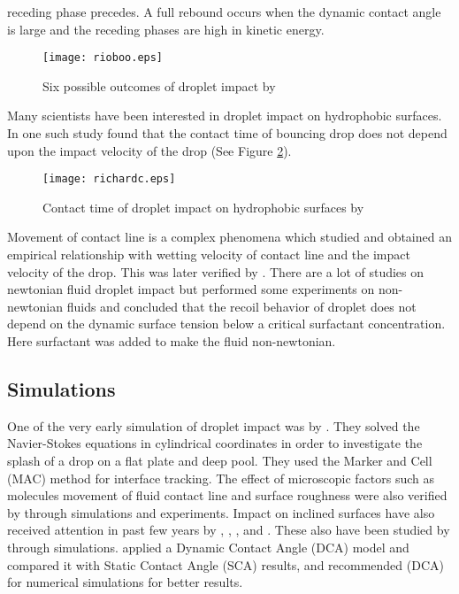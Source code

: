 receding phase  precedes. A full rebound occurs when the dynamic contact angle is large and the receding phases are high in kinetic energy.
\begin{figure}[tbp]
\centering
 \texttt{[image: rioboo.eps]}
 \caption[Possible outcomes of droplet impact]{Six possible outcomes of droplet impact by \cite{Rioboo2001} }
 \label{rioboo}
\end{figure}
Many scientists have been interested in droplet impact on hydrophobic surfaces. In one such study \cite{Richard2002} found that the contact time of 
bouncing drop does not depend upon the impact velocity of the drop (See Figure \ref{richard2}).
\begin{figure}[tbp]
\centering
 \texttt{[image: richardc.eps]}
 \caption[Contact time of droplet impact on hydrophobic surfaces ]{Contact time of droplet impact on hydrophobic surfaces by \cite{Richard2002} }
 \label{richard2}
\end{figure}
Movement of contact line is a complex phenomena which \cite{Roux2004} studied and obtained an empirical relationship with wetting velocity
of contact line and the impact velocity of the drop. This was later verified by \cite{Hung2011}.
There are a lot of studies on newtonian fluid droplet impact but \cite{Crooks2001} performed some experiments on non-newtonian 
fluids and concluded that the recoil behavior of droplet does not depend on the dynamic surface tension below a critical surfactant
concentration. Here surfactant was added to make the fluid non-newtonian.
\subsection{Simulations}
One of the very early simulation of droplet impact was by \cite{Harlow1967}. They solved the Navier-Stokes equations in cylindrical coordinates in order to
investigate the splash of a drop on a flat plate and deep pool. They used the Marker and Cell {(MAC)} method for interface tracking. The effect of microscopic 
factors such as molecules movement of fluid contact line and surface roughness were also verified by \cite{Gunjal2005} through simulations and experiments. Impact on
inclined surfaces have also received attention in past few years by \cite{Pasandideh1996}, \cite{Kang2000}, \cite{Fukai2000}, \cite{Bussmann1999} and \cite{Sikalo2005}.
These also have been studied by \cite{Lunkad2007} through simulations. \cite{Lunkad2007} applied a Dynamic Contact Angle {(DCA)} model and compared it with Static Contact 
Angle {(SCA)} results, and recommended   {(DCA)} for numerical simulations for better results.

